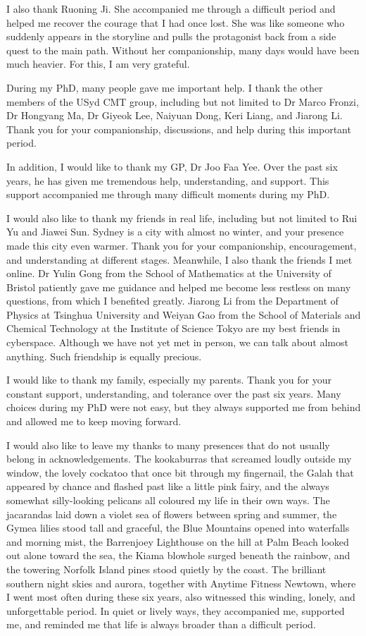 I also thank Ruoning Ji.
She accompanied me through a difficult period and helped me recover the courage that I had once lost.
She was like someone who suddenly appears in the storyline and pulls the protagonist back from a side quest to the main path.
Without her companionship, many days would have been much heavier.
For this, I am very grateful.

During my PhD, many people gave me important help.
I thank the other members of the USyd CMT group, including but not limited to Dr Marco Fronzi, Dr Hongyang Ma, Dr Giyeok Lee, Naiyuan Dong, Keri Liang, and Jiarong Li.
Thank you for your companionship, discussions, and help during this important period.

In addition, I would like to thank my GP, Dr Joo Faa Yee.
Over the past six years, he has given me tremendous help, understanding, and support.
This support accompanied me through many difficult moments during my PhD.

I would also like to thank my friends in real life, including but not limited to Rui Yu and Jiawei Sun.
Sydney is a city with almost no winter, and your presence made this city even warmer.
Thank you for your companionship, encouragement, and understanding at different stages.
Meanwhile, I also thank the friends I met online.
Dr Yulin Gong from the School of Mathematics at the University of Bristol patiently gave me guidance and helped me become less restless on many questions, from which I benefited greatly.
Jiarong Li from the Department of Physics at Tsinghua University and Weiyan Gao from the School of Materials and Chemical Technology at the Institute of Science Tokyo are my best friends in cyberspace.
Although we have not yet met in person, we can talk about almost anything.
Such friendship is equally precious.

I would like to thank my family, especially my parents.
Thank you for your constant support, understanding, and tolerance over the past six years.
Many choices during my PhD were not easy, but they always supported me from behind and allowed me to keep moving forward.

I would also like to leave my thanks to many presences that do not usually belong in acknowledgements.
The kookaburras that screamed loudly outside my window, the lovely cockatoo that once bit through my fingernail,
the Galah that appeared by chance and flashed past like a little pink fairy,
and the always somewhat silly-looking pelicans all coloured my life in their own ways.
The jacarandas laid down a violet sea of flowers between spring and summer,
the Gymea lilies stood tall and graceful,
the Blue Mountains opened into waterfalls and morning mist,
the Barrenjoey Lighthouse on the hill at Palm Beach looked out alone toward the sea,
the Kiama blowhole surged beneath the rainbow,
and the towering Norfolk Island pines stood quietly by the coast.
The brilliant southern night skies and aurora,
together with Anytime Fitness Newtown, where I went most often during these six years,
also witnessed this winding, lonely, and unforgettable period.
In quiet or lively ways, they accompanied me, supported me, and reminded me that life is always broader than a difficult period.

